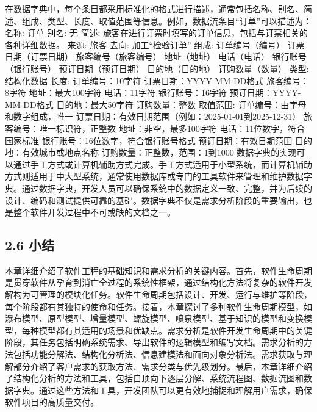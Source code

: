 在数据字典中，每个条目都采用标准化的格式进行描述，通常包括名称、别名、简述、组成、类型、长度、取值范围等信息。例如，数据流条目``订单''可以描述为： 名称: 订单 别名: 无 简述:
旅客在进行订票时填写的订单信息，包括与订票相关的各种详细数据。 来源: 旅客 去向: 加工``检验订单'' 组成: 订单编号（编号） 订票日期（订票日期） 旅客编号（旅客编号） 地址（地址） 电话（电话） 银行账号（银行账号）
预订日期（预订日期） 目的地（目的地） 订购数量（数量） 类型: 结构化数据 长度: 订单编号：10字符 订票日期：YYYY-MM-DD格式 旅客编号：8字符 地址：最大100字符 电话：11字符 银行账号：16字符
预订日期：YYYY-MM-DD格式 目的地：最大50字符 订购数量：整数 取值范围: 订单编号：由字母和数字组成，唯一 订票日期：有效日期范围（例如：2025-01-01到2025-12-31） 旅客编号：唯一标识符，正整数
地址：非空，最多100字符 电话：11位数字，符合国家标准 银行账号：16位数字，符合银行账号格式 预订日期：有效日期范围 目的地：有效城市或地点名称 订购数量：正整数，范围：1到1000
数据字典的实现可以通过手工方式或计算机辅助方式完成。手工方式适用于小型系统，而计算机辅助方式则适用于中大型系统，通常使用数据库或专门的工具软件来管理和维护数据字典。通过数据字典，开发人员可以确保系统中的数据定义一致、完整，并为后续的设计、编码和测试提供可靠的基础。数据字典不仅是需求分析阶段的重要输出，也是整个软件开发过程中不可或缺的文档之一。
\subsection{2.6 小结}\label{ux5c0fux7ed3}
本章详细介绍了软件工程的基础知识和需求分析的关键内容。首先，软件生命周期是贯穿软件从孕育到消亡全过程的系统性框架，通过结构化方法将复杂的软件开发解构为可管理的模块化任务。软件生命周期包括设计、开发、运行与维护等阶段，每个阶段都有其独特的使命和任务。接着，本章探讨了多种软件生命周期模型，如瀑布模型、原型模型、增量模型、螺旋模型、喷泉模型、基于知识的模型和变换模型，每种模型都有其适用的场景和优缺点。需求分析是软件开发生命周期中的关键阶段，其任务包括明确系统需求、导出软件的逻辑模型和编写文档。需求分析的方法包括功能分解法、结构化分析法、信息建模法和面向对象分析法。需求获取与理解部分介绍了客户需求的获取方法、需求分类与优先级划分。最后，本章详细介绍了结构化分析的方法和工具，包括自顶向下逐层分解、系统流程图、数据流图和数据字典。通过这些方法和工具，开发团队可以更有效地捕捉和理解用户需求，确保软件项目的高质量交付。
